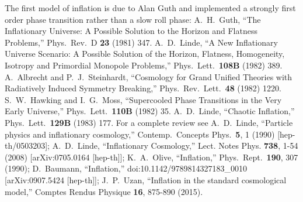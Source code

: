 \documentclass[%
aps,prd,nofootinbib,showkeys,a4paper,10pt
]{revtex4-2}
\begin{document}
\begin{thebibliography}{10}






The first model of inflation is due to Alan Guth and implemented a strongly first order phase transition rather than a slow roll phase:
A.~H.~Guth,
``The Inflationary Universe: A Possible Solution to the Horizon and Flatness Problems,''
Phys.\ Rev.\ D {\bf 23} (1981) 347.
A.~D.~Linde,
``A New Inflationary Universe Scenario: A Possible Solution of the Horizon, Flatness, Homogeneity, Isotropy and Primordial Monopole Problems,''
Phys.\ Lett.\  {\bf 108B} (1982) 389.
A.~Albrecht and P.~J.~Steinhardt,
``Cosmology for Grand Unified Theories with Radiatively Induced Symmetry Breaking,''
Phys.\ Rev.\ Lett.\  {\bf 48} (1982) 1220.
S.~W.~Hawking and I.~G.~Moss,
``Supercooled Phase Transitions in the Very Early Universe,''
Phys.\ Lett.\  {\bf 110B} (1982) 35.
A.~D.~Linde,
``Chaotic Inflation,''
Phys.\ Lett.\  {\bf 129B} (1983) 177.
For a complete review see
A.~D.~Linde,
``Particle physics and inflationary cosmology,''
Contemp.\ Concepts Phys.\  {\bf 5}, 1 (1990)
[hep-th/0503203];
A.~D.~Linde,
``Inflationary Cosmology,''
Lect. Notes Phys. \textbf{738}, 1-54 (2008)
[arXiv:0705.0164 [hep-th]];
K.~A.~Olive,
``Inflation,''
Phys.\ Rept.\  {\bf 190}, 307 (1990);
D.~Baumann,
``Inflation,''
doi:10.1142/9789814327183\_0010
[arXiv:0907.5424 [hep-th]];
J.~P.~Uzan,
``Inflation in the standard cosmological model,''
Comptes Rendus Physique \textbf{16}, 875-890 (2015).







\end{thebibliography}
\end{document}
